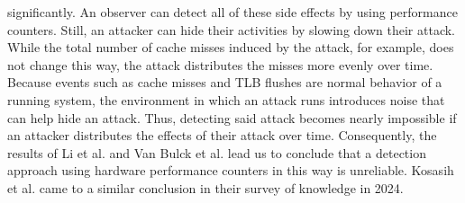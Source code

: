 significantly. An observer can detect all of these side effects by using
performance counters. Still, an attacker can hide their activities by slowing
down their attack. While the total number of cache misses induced by the attack,
for example, does not change this way, the attack distributes the misses more
evenly over time. Because events such as cache misses and TLB flushes are normal
behavior of a running system, the environment in which an attack runs introduces
noise that can help hide an attack. Thus, detecting said attack becomes nearly
impossible if an attacker distributes the effects of their attack over time.
Consequently, the results of Li et al. and Van Bulck et al. lead us to conclude
that a detection approach using hardware performance counters in this way is
unreliable. Kosasih et al. came to a similar conclusion in their survey of
knowledge in 2024.\cite{kosasih2024sok}

